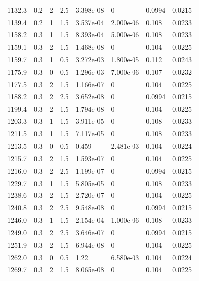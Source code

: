 \documentclass[preview]{standalone}
\begin{document}
{{{{\begin{tabular}{L{1.2cm}C{1.2cm} C{0.3cm}C{0.5cm} C{1.4cm}C{1.4cm} C{1.4cm}C{1.4cm}}
  1132.3  &   0.2  & 2     & 2.5 &  3.398e-08  & 0  & 0.0994 &  0.0215   \\ 
  1139.4  &   0.2  & 1     & 1.5 &  3.537e-04  & 2.000e-06  & 0.108 &  0.0233   \\ 
  1158.2  &   0.3  & 1     & 1.5 &  8.393e-04  & 5.000e-06  & 0.108 &  0.0233   \\ 
  1159.1  &   0.3  & 2     & 1.5 &  1.468e-08  & 0  & 0.104 &  0.0225   \\ 
  1159.7  &   0.3  & 1     & 0.5 &  3.272e-03  & 1.800e-05  & 0.112 &  0.0243   \\ 
  1175.9  &   0.3  & 0     & 0.5 &  1.296e-03  & 7.000e-06  & 0.107 &  0.0232   \\ 
  1177.5  &   0.3  & 2     & 1.5 &  1.166e-07  & 0  & 0.104 &  0.0225   \\ 
  1188.2  &   0.3  & 2     & 2.5 &  3.652e-08  & 0  & 0.0994 &  0.0215   \\ 
  1199.4  &   0.3  & 2     & 1.5 &  1.794e-08  & 0  & 0.104 &  0.0225   \\ 
  1203.3  &   0.3  & 1     & 1.5 &  3.911e-05  & 0  & 0.108 &  0.0233   \\ 
  1211.5  &   0.3  & 1     & 1.5 &  7.117e-05  & 0  & 0.108 &  0.0233   \\ 
  1213.5  &   0.3  & 0     & 0.5 &  0.459  & 2.481e-03  & 0.104 &  0.0224   \\ 
  1215.7  &   0.3  & 2     & 1.5 &  1.593e-07  & 0  & 0.104 &  0.0225   \\ 
  1216.0  &   0.3  & 2     & 2.5 &  1.199e-07  & 0  & 0.0994 &  0.0215   \\ 
  1229.7  &   0.3  & 1     & 1.5 &  5.805e-05  & 0  & 0.108 &  0.0233   \\ 
  1238.6  &   0.3  & 2     & 1.5 &  2.720e-07  & 0  & 0.104 &  0.0225   \\ 
  1240.8  &   0.3  & 2     & 2.5 &  9.548e-08  & 0  & 0.0994 &  0.0215   \\ 
  1246.0  &   0.3  & 1     & 1.5 &  2.154e-04  & 1.000e-06  & 0.108 &  0.0233   \\ 
  1249.0  &   0.3  & 2     & 2.5 &  3.646e-07  & 0  & 0.0994 &  0.0215   \\ 
  1251.9  &   0.3  & 2     & 1.5 &  6.944e-08  & 0  & 0.104 &  0.0225   \\ 
  1262.0  &   0.3  & 0     & 0.5 &  1.22  & 6.580e-03  & 0.104 &  0.0224   \\ 
  1269.7  &   0.3  & 2     & 1.5 &  8.065e-08  & 0  & 0.104 &  0.0225   \\ 

\end{tabular}}}}}
\end{document}
